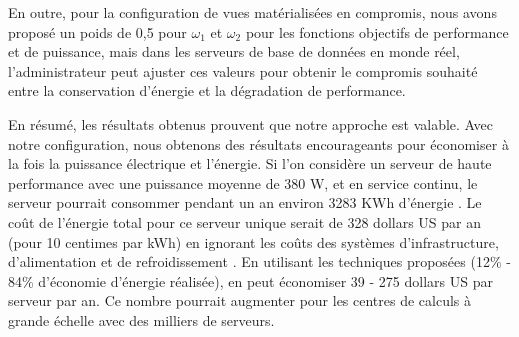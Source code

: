 En outre, pour la configuration de vues matérialisées en compromis, nous avons proposé un poids de 0,5 pour $\omega_1$ et $\omega_2$ pour les fonctions objectifs de performance et de puissance, mais dans les serveurs de base de données en monde réel, l'administrateur peut ajuster ces valeurs pour obtenir le compromis souhaité entre la conservation d'énergie et la dégradation de performance.

En résumé, les résultats obtenus prouvent que notre approche est valable. Avec notre configuration, nous obtenons des résultats encourageants pour économiser à la fois la puissance électrique et l'énergie. Si l'on considère un serveur de haute performance avec une puissance moyenne de 380 W, et en service continu, le serveur pourrait consommer pendant un an environ 3283 KWh d'énergie \cite{Barielle11}. Le coût de l'énergie total pour ce serveur unique serait de 328 dollars US par an (pour 10 centimes par kWh) en ignorant les coûts des systèmes d'infrastructure,  d'alimentation et de refroidissement \cite{Barielle11}. En utilisant les techniques proposées (12\% - 84\% d'économie d'énergie réalisée), en peut économiser 39 - 275 dollars US par serveur par an. Ce nombre pourrait augmenter pour les centres de calculs à grande échelle avec des milliers de serveurs.

